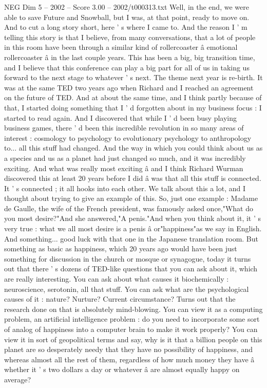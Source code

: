 \begin{textsample}{NEG Dim 5 – 2002 – Score 3.00 – 2002/t000313.txt}
Well, in the end, we were able to save Future and Snowball, but I was, at that point, ready to move on.
And to cut a long story short, here ' s where I came to.
And the reason I ' m telling this story is that I believe, from many conversations, that a lot of people in this room have been through a similar kind of rollercoaster â emotional rollercoaster â in the last couple years.
This has been a big, big transition time, and I believe that this conference can play a big part for all of us in taking us forward to the next stage to whatever ' s next.
The theme next year is re-birth.
It was at the same TED two years ago when Richard and I reached an agreement on the future of TED.
And at about the same time, and I think partly because of that, I started doing something that I ' d forgotten about in my business focus : I started to read again.
And I discovered that while I ' d been busy playing business games, there ' d been this incredible revolution in so many areas of interest : cosmology to psychology to evolutionary psychology to anthropology to... all this stuff had changed.
And the way in which you could think about us as a species and us as a planet had just changed so much, and it was incredibly exciting.
And what was really most exciting â and I think Richard Wurman discovered this at least 20 years before I did â was that all this stuff is connected.
It ' s connected ; it all hooks into each other.
We talk about this a lot, and I thought about trying to give an example of this.
So, just one example : Madame de Gaulle, the wife of the French president, was famously asked once,"What do you most desire?"And she answered,"A penis."And when you think about it, it ' s very true : what we all most desire is a penis â or"happiness"as we say in English.
And something... good luck with that one in the Japanese translation room.
But something as basic as happiness, which 20 years ago would have been just something for discussion in the church or mosque or synagogue, today it turns out that there ' s dozens of TED-like questions that you can ask about it, which are really interesting.
You can ask about what causes it biochemically : neuroscience, serotonin, all that stuff.
You can ask what are the psychological causes of it : nature?
Nurture?
Current circumstance?
Turns out that the research done on that is absolutely mind-blowing.
You can view it as a computing problem, an artificial intelligence problem : do you need to incorporate some sort of analog of happiness into a computer brain to make it work properly?
You can view it in sort of geopolitical terms and say, why is it that a billion people on this planet are so desperately needy that they have no possibility of happiness, and whereas almost all the rest of them, regardless of how much money they have â whether it ' s two dollars a day or whatever â are almost equally happy on average?

\end{textsample}
